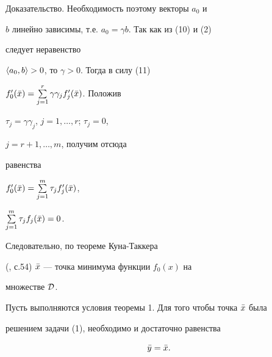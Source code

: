 \begin{pf*}{Доказательство. Необходимость}
поэтому векторы $a_0$ и


$b$ линейно зависимы, т.е. $a_0=\gamma b$. Так как из (10) и (2)


следует неравенство


$\langle a_0,b\rangle >0$, то $\gamma>0$. Тогда в силу (11)


$f'_0(\Bar x)=\sum\limits^r_{j=1}\gamma\gamma_jf'_j(\Bar x)$. Положив


$\tau_j=\gamma\gamma_j$, $j=1,\dotsc,r$; $\tau_j=0$,


$j=r+1,\dotsc,m$, получим отсюда


равенства


$f'_0(\Bar x)=\sum\limits^m_{j=1}\tau_jf'_j(\Bar x)$,


$\sum\limits^m_{j=1}\tau_jf_j(\Bar x)=0$.


Следовательно, по теореме Куна-Таккера


(\cite{Kar}, с.54) $\Bar x$ --- точка минимума функции $f_0(x)$ на


множестве $\cal D$.


\end{pf*}





\begin{cornonum}


Пусть выполняются условия теоремы 1. Для того чтобы точка $\Bar x$ была


решением задачи (1), необходимо и достаточно равенства


\begin{equation}


\Bar y=\Bar x.


\end{equation}


\end{cornonum}





